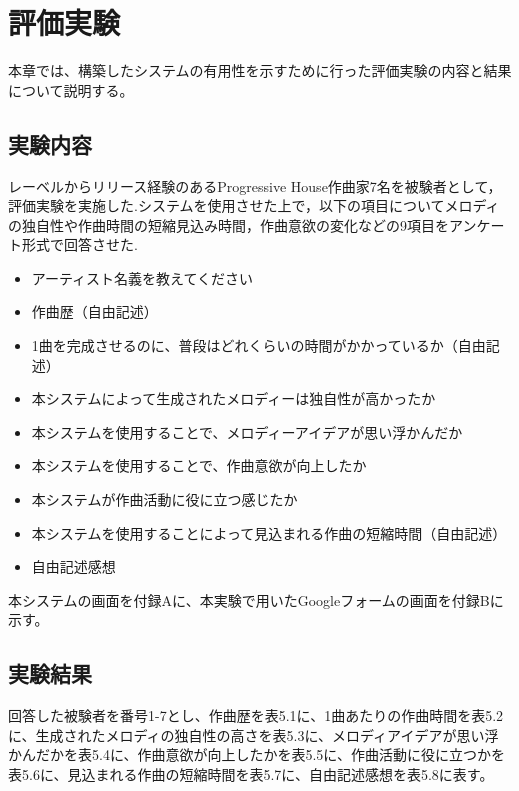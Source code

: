 \chapter{評価実験}
本章では、構築したシステムの有用性を示すために行った評価実験の内容と結果について説明する。

\section{実験内容}
レーベルからリリース経験のあるProgressive House作曲家7名を被験者として，評価実験を実施した.システムを使用させた上で，以下の項目についてメロディの独自性や作曲時間の短縮見込み時間，作曲意欲の変化などの9項目をアンケート形式で回答させた.
\begin{itemize}
  \item アーティスト名義を教えてください
  \item 作曲歴（自由記述）
  \item 1曲を完成させるのに、普段はどれくらいの時間がかかっているか（自由記述）
  \item 本システムによって生成されたメロディーは独自性が高かったか
  \item 本システムを使用することで、メロディーアイデアが思い浮かんだか
  \item 本システムを使用することで、作曲意欲が向上したか
  \item 本システムが作曲活動に役に立つ感じたか
  \item 本システムを使用することによって見込まれる作曲の短縮時間（自由記述）
  \item 自由記述感想
\end{itemize}
本システムの画面を付録Aに、本実験で用いたGoogleフォームの画面を付録Bに示す。

\section{実験結果}
回答した被験者を番号1-7とし、作曲歴を表5.1に、1曲あたりの作曲時間を表5.2に、生成されたメロディの独自性の高さを表5.3に、メロディアイデアが思い浮かんだかを表5.4に、作曲意欲が向上したかを表5.5に、作曲活動に役に立つかを表5.6に、見込まれる作曲の短縮時間を表5.7に、自由記述感想を表5.8に表す。


